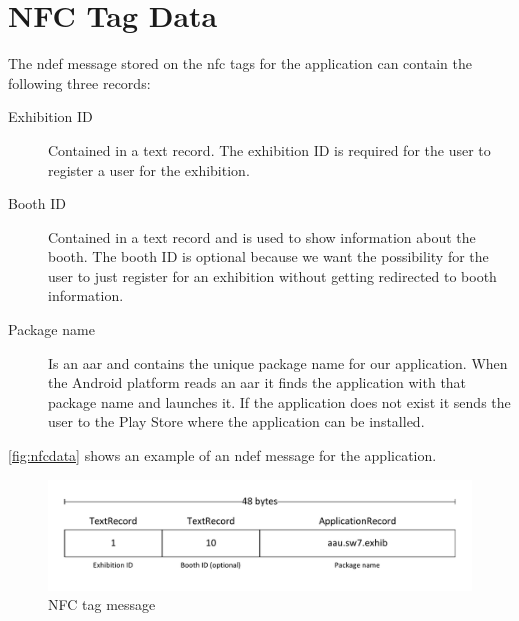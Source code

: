 \section{NFC Tag Data}
\label{sec:nfcdata}

The \ac{ndef} message stored on the \ac{nfc} tags for the application can contain the following three records:

\begin{description}
\item[Exhibition ID] Contained in a text record. The exhibition ID is required for the user to register a user for the exhibition.
\item[Booth ID] Contained in a text record and is used to show information about the booth. The booth ID is optional because we want the possibility for the user to just register for an exhibition without getting redirected to booth information.
\item[Package name] Is an \ac{aar} and contains the unique package name for our application. When the Android platform reads an \ac{aar} it finds the application with that package name and launches it. If the application does not exist it sends the user to the Play Store where the application can be installed.
\end{description}
\autoref{fig:nfcdata} shows an example of an \ac{ndef} message for the application.

\begin{figure}[H]
\centering
\includegraphics[width=\columnwidth]{img/nfctag.pdf}
\caption{NFC tag message}
\label{fig:nfcdata}
\end{figure}
